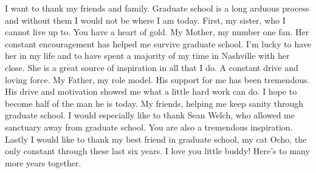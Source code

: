 I want to thank my friends and family. Graduate school is a long arduous process and without them I would not be where I am today. First, my sister, who I cannot live up to. You have a heart of gold. My Mother, my number one fan. Her constant encouragement has helped me survive graduate school. I'm lucky to have her in my life and to have spent a majority of my time in Nashville with her close. She is a great source of inspiration in all that I do. A constant drive and loving force. My Father, my role model. His support for me has been tremendous. His drive and motivation showed me what a little hard work can do. I hope to become half of the man he is today. My friends, helping me keep sanity through graduate school. I would especially like to thank Sean Welch, who allowed me sanctuary away from graduate school. You are also a tremendous inspiration. Lastly I would like to thank my best friend in graduate school, my cat Ocho, the only constant through these last six years. I love you little buddy! Here's to many more years together.
